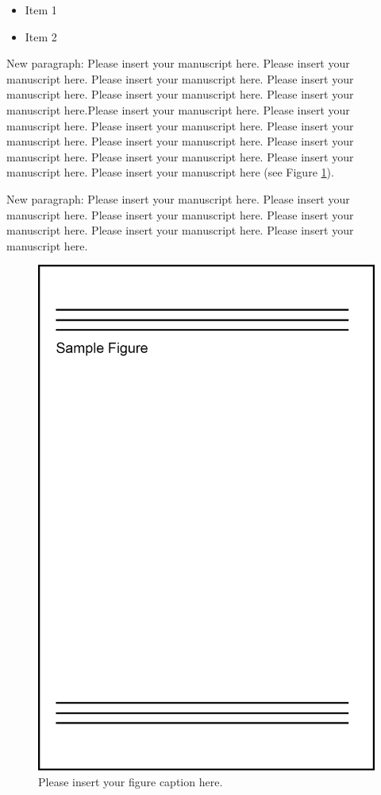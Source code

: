 \documentclass[USenglish,twocolumn]{article}
\begin{document}
  \begin{itemize}
    \item Item 1
    \item Item 2
  \end{itemize}

  New paragraph: Please insert your manuscript here. Please insert your manuscript here. Please insert your manuscript here. Please insert your manuscript here. Please insert your manuscript here. Please insert your manuscript here.Please insert your manuscript here. Please insert your manuscript here. Please insert your manuscript here. Please insert your manuscript here. Please insert your manuscript here. Please insert your manuscript here. Please insert your manuscript here. Please insert your manuscript here. Please insert your manuscript here (see Figure \ref{img:Figure1}).

  New paragraph: Please insert your manuscript here. Please insert your manuscript here. Please insert your manuscript here. Please insert your manuscript here. Please insert your manuscript here. Please insert your manuscript here.

  \begin{figure}
    \includegraphics[width=\columnwidth]{graphics/sample-figure1}
    \caption{Please insert your figure caption here.}
    \label{img:Figure1}
  \end{figure}
\end{document}
